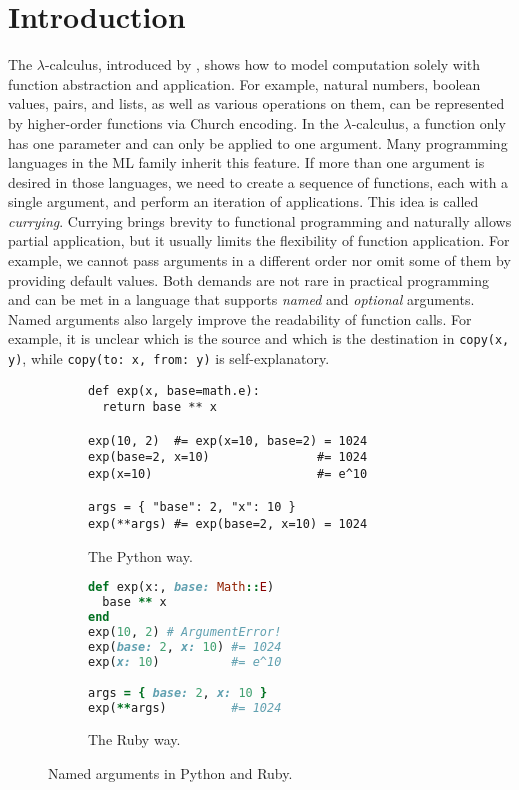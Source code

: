 \section{Introduction} \label{sec:existing}

The $\lambda$-calculus, introduced by \citet{church1941calculi}, shows how to
model computation solely with function abstraction and application. For example,
natural numbers, boolean values, pairs, and lists, as well as various operations
on them, can be represented by higher-order functions via Church encoding. In
the $\lambda$-calculus, a function only has one parameter and can only be
applied to one argument. Many programming languages in the ML family inherit
this feature. If more than one argument is desired in those languages, we need
to create a sequence of functions, each with a single argument, and perform an
iteration of applications. This idea is called \emph{currying}. Currying brings
brevity to functional programming and naturally allows partial application, but
it usually limits the flexibility of function application. For example, we
cannot pass arguments in a different order nor omit some of them by providing
default values. Both demands are not rare in practical programming and can be
met in a language that supports \emph{named} and \emph{optional} arguments.
Named arguments also largely improve the readability of function calls. For
example, it is unclear which is the source and which is the destination in
\lstinline{copy(x, y)}, while \lstinline{copy(to: x, from: y)} is
self-explanatory.

\begin{figure}
\begin{subfigure}{0.5\textwidth}
\begin{lstlisting}[language={[3]Python}]
def exp(x, base=math.e):
  return base ** x

exp(10, 2)  #= exp(x=10, base=2) = 1024
exp(base=2, x=10)               #= 1024
exp(x=10)                       #= e^10

args = { "base": 2, "x": 10 }
exp(**args) #= exp(base=2, x=10) = 1024
\end{lstlisting}
\caption{The Python way.} \label{fig:python}
\end{subfigure}
\hfill
\begin{subfigure}{0.35\textwidth}
\begin{lstlisting}[language=Ruby]
def exp(x:, base: Math::E)
  base ** x
end
exp(10, 2) # ArgumentError!
exp(base: 2, x: 10) #= 1024
exp(x: 10)          #= e^10

args = { base: 2, x: 10 }
exp(**args)         #= 1024
\end{lstlisting}
\caption{The Ruby way.} \label{fig:ruby}
\end{subfigure}
\caption{Named arguments in Python and Ruby.} \label{fig:python-ruby}
\end{figure}

